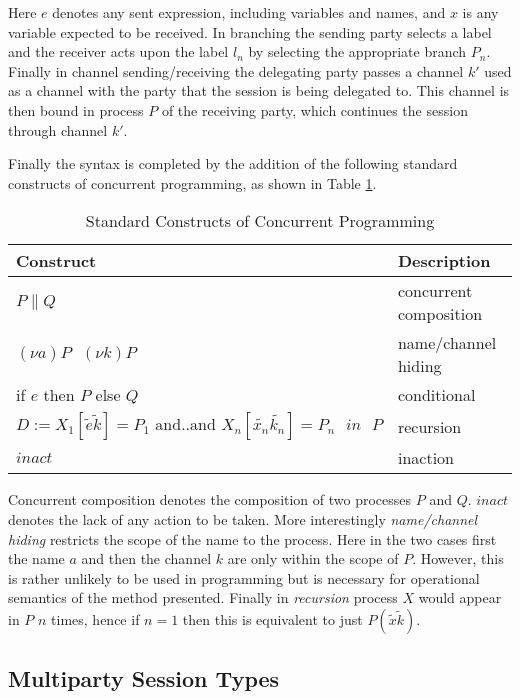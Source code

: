 Here $e$ denotes any sent expression, including variables and names, and $x$ is any variable expected to be received. In branching the sending party selects a label and the receiver acts upon the label $l_n$ by selecting the appropriate branch $P_n$. Finally in channel sending/receiving the delegating party passes a channel $k'$ used as a channel with the party that the session is being delegated to. This channel is then bound in process $P$ of the receiving party, which continues the session through channel $k'$.

Finally the syntax is completed by the addition of the following standard constructs of concurrent programming, as shown in Table \ref{TBstd_constructs}.

\begin{table}[H]
\center
\caption{Standard Constructs of Concurrent Programming}
\begin{tabular}{|l|l|}
  \hline
  Construct & Description \\
  \hline
  $P\|Q$ & concurrent composition\\
  $(\nu a)P \mbox{  } (\nu k)P$  & name/channel hiding \\
  if $e$ then $P$ else $Q$ & conditional \\
  $D:=X_1[\tilde{e}\tilde{k}]=P_1\mbox{ and..and } X_n[\tilde{x_n}\tilde{k_n}] = P_n\mbox{ } in \mbox{ }P$ & recursion\\
  $inact$ & inaction \\
  \hline
\end{tabular}
\label{TBstd_constructs}
\end{table}

Concurrent composition denotes the composition of two processes $P$ and $Q$. $inact$ denotes the lack of any action to be taken. More interestingly \textit{name/channel hiding} restricts the scope of the name to the process. Here in the two cases first the name $a$ and then the channel $k$ are only within the scope of $P$. However, this is rather unlikely to be used in programming but is necessary for operational semantics of the method presented. Finally in \textit{recursion} process $X$ would appear in $P$ $n$ times, hence if $n=1$ then this is equivalent to just $P(\tilde{x}\tilde{k})$.	

		
\subsection{Multiparty Session Types}
\label{subsec:mpsessiontypes}

